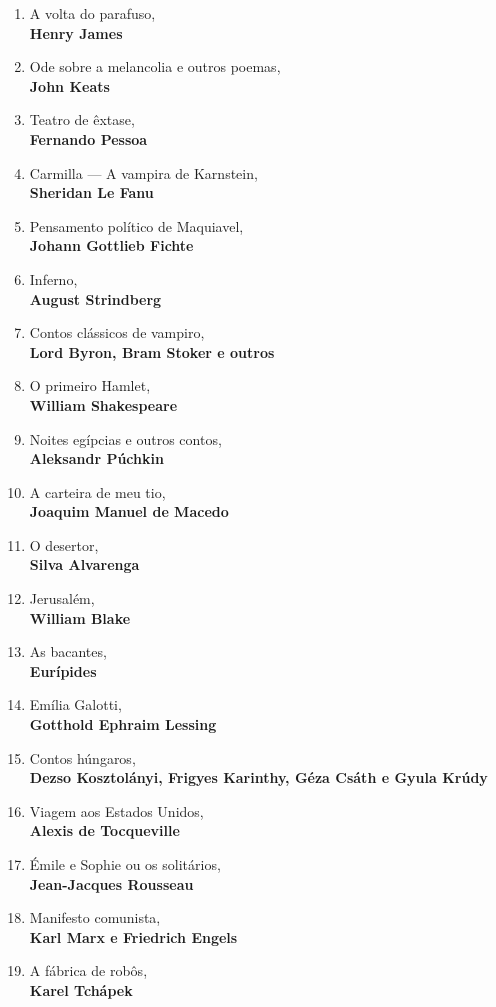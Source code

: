 \begin{enumerate} [font=\Formular\scriptsize]
\item A volta do parafuso,\\ \textbf{Henry James}
\item Ode sobre a melancolia e outros poemas,\\ \textbf{John Keats} 
\item Teatro de êxtase,\\ \textbf{Fernando Pessoa}
\item Carmilla --- A vampira de Karnstein,\\ \textbf{Sheridan Le Fanu}
\item Pensamento político de Maquiavel,\\ \textbf{Johann Gottlieb Fichte}
\item Inferno,\\ \textbf{August Strindberg}
\item Contos clássicos de vampiro,\\ \textbf{Lord Byron, Bram Stoker e outros}
\item O primeiro Hamlet,\\ \textbf{William Shakespeare}
\item Noites egípcias e outros contos,\\ \textbf{Aleksandr Púchkin}
\item A carteira de meu tio,\\ \textbf{Joaquim Manuel de Macedo}
\item O desertor,\\ \textbf{Silva Alvarenga}
\item Jerusalém,\\ \textbf{William Blake}
\item As bacantes,\\ \textbf{Eurípides}
\item Emília Galotti,\\ \textbf{Gotthold Ephraim Lessing}
\item Contos húngaros,\\ \textbf{Dezso Kosztolányi, Frigyes Karinthy, Géza Csáth e Gyula Krúdy}
\item Viagem aos Estados Unidos,\\ \textbf{Alexis de Tocqueville}
\item Émile e Sophie ou os solitários,\\ \textbf{Jean-Jacques Rousseau}
\item Manifesto comunista,\\ \textbf{Karl Marx e Friedrich Engels}
\item A fábrica de robôs,\\ \textbf{Karel Tchápek}

\end{enumerate}
